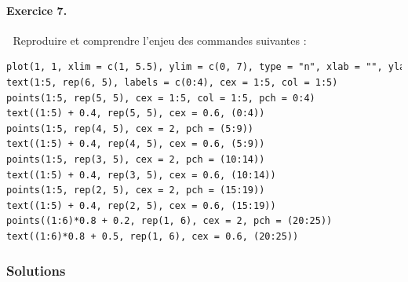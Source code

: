 \paragraph{Exercice 7. }\textcolor{white}{.}\newline
Reproduire et comprendre l'enjeu des commandes suivantes :
\begin{lstlisting}[language=html]
plot(1, 1, xlim = c(1, 5.5), ylim = c(0, 7), type = "n", xlab = "", ylab = "")
text(1:5, rep(6, 5), labels = c(0:4), cex = 1:5, col = 1:5)
points(1:5, rep(5, 5), cex = 1:5, col = 1:5, pch = 0:4)
text((1:5) + 0.4, rep(5, 5), cex = 0.6, (0:4))
points(1:5, rep(4, 5), cex = 2, pch = (5:9))
text((1:5) + 0.4, rep(4, 5), cex = 0.6, (5:9))
points(1:5, rep(3, 5), cex = 2, pch = (10:14))
text((1:5) + 0.4, rep(3, 5), cex = 0.6, (10:14))
points(1:5, rep(2, 5), cex = 2, pch = (15:19))
text((1:5) + 0.4, rep(2, 5), cex = 0.6, (15:19))
points((1:6)*0.8 + 0.2, rep(1, 6), cex = 2, pch = (20:25))
text((1:6)*0.8 + 0.5, rep(1, 6), cex = 0.6, (20:25))
\end{lstlisting}
\subsubsection{Solutions}
